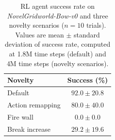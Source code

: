 \begin{table}[!tb]
\begin{center}
\renewcommand{\arraystretch}{1.22}
\begin{tabular}{lc}
 \toprule
 \textbf{Novelty} & \textbf{Success (\%)} \\
 \midrule
 Default          & $92.0 \pm 20.8$ \\
 Action remapping & $80.0 \pm 40.0$ \\
 Fire wall        & $0.0  \pm 0.0$  \\
 Break increase   & $29.2 \pm 19.6$ \\
 \bottomrule
\end{tabular}
\caption[RL success rate across novelty scenarios]{RL agent success rate on \emph{NovelGridworld-Bow-v0} and three novelty scenarios ($n=10$ trials). Values are mean $\pm$ standard deviation of success rate, computed at 1.8M time steps (default) and 4M time steps (novelty scenarios).}
\label{tab:results_rl}
\end{center}
\end{table}
